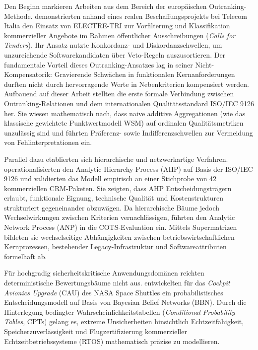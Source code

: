 Den Beginn markieren Arbeiten aus dem Bereich der europäischen Outranking-Methode. \textcite{LZQJ6M4X} demonstrierten anhand eines realen Beschaffungsprojekts bei Telecom Italia den Einsatz von ELECTRE-TRI zur Vorfilterung und Klassifikation kommerzieller Angebote im Rahmen öffentlicher Ausschreibungen (\textit{Calls for Tenders}). Ihr Ansatz nutzte Konkordanz- und Diskordanzschwellen, um unzureichende Softwarekandidaten über Veto-Regeln auszusortieren. Der fundamentale Vorteil dieses Outranking-Ansatzes lag in seiner Nicht-Kompensatorik: Gravierende Schwächen in funktionalen Kernanforderungen durften nicht durch hervorragende Werte in Nebenkriterien kompensiert werden. Aufbauend auf dieser Arbeit stellten \textcite{M3B2D3GD} die erste formale Verbindung zwischen Outranking-Relationen und dem internationalen Qualitätsstandard ISO/IEC 9126 her. Sie wiesen mathematisch nach, dass naive additive Aggregationen (wie das klassische gewichtete Punktwertmodell WSM) auf ordinalen Qualitätsmetriken unzulässig sind und führten Präferenz- sowie Indifferenzschwellen zur Vermeidung von Fehlinterpretationen ein.

Parallel dazu etablierten sich hierarchische und netzwerkartige Verfahren. \textcite{DAU8NSK8} operationalisierten den Analytic Hierarchy Process (AHP) auf Basis der ISO/IEC 9126 und validierten das Modell empirisch an einer Stichprobe von 42 kommerziellen CRM-Paketen. Sie zeigten, dass AHP Entscheidungsträgern erlaubt, funktionale Eignung, technische Qualität und Kostenstrukturen strukturiert gegeneinander abzuwägen. Da hierarchische Bäume jedoch Wechselwirkungen zwischen Kriterien vernachlässigen, führten \textcite{FCYW9EWJ} den Analytic Network Process (ANP) in die COTS-Evaluation ein. Mittels Supermatrizen bildeten sie wechselseitige Abhängigkeiten zwischen betriebswirtschaftlichen Kernprozessen, bestehender Legacy-Infrastruktur und Softwareattributen formelhaft ab.

Für hochgradig sicherheitskritische Anwendungsdomänen reichten deterministische Bewertungsbäume nicht aus. \textcite{QDUNCXFC} entwickelten für das \textit{Cockpit Avionics Upgrade} (CAU) des NASA Space Shuttles ein probabilistisches Entscheidungsmodell auf Basis von Bayesian Belief Networks (BBN). Durch die Hinterlegung bedingter Wahrscheinlichkeitstabellen (\textit{Conditional Probability Tables}, CPTs) gelang es, extreme Unsicherheiten hinsichtlich Echtzeitfähigkeit, Speicherzuverlässigkeit und Flugzertifizierung kommerzieller Echtzeitbetriebssysteme (RTOS) mathematisch präzise zu modellieren.

